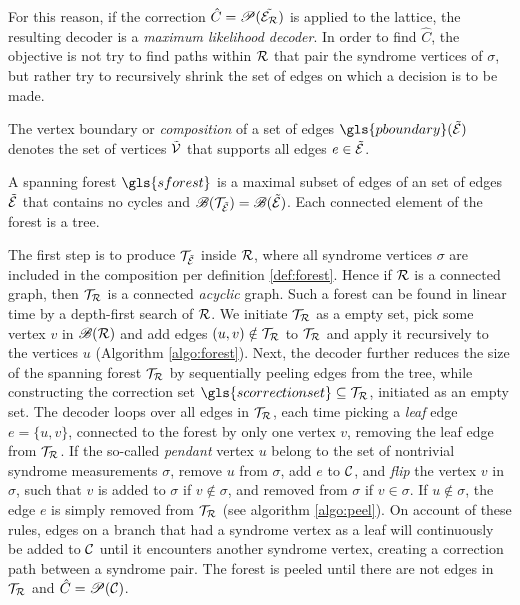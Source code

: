 For this reason, if the correction $\hat{C}=\mathscr{P}(\tilde{\mathcal{E}_{\mathcal{R}}})$ is applied to the lattice, the resulting decoder is a \emph{maximum likelihood decoder}. In order to find $\hat{C}$, the objective is not try to find paths within $\mathcal{R}$ that pair the syndrome vertices of $\sigma$, but rather try to recursively shrink the set of edges on which a decision is to be made.
\begin{definition}\label{def:boundaryofedges}
  The vertex boundary or \emph{composition} of a set of edges $\gls{pboundary}(\tilde{\m{E}})$ denotes the set of vertices $\tilde{\mathcal{V}}$ that supports all edges $e\in \tilde{\mathcal{E}}$.
\end{definition}
\begin{definition}\label{def:forest}
  A spanning forest $\gls{sforest}$ is a maximal subset of edges of an set of edges $\tilde{\mathcal{E}}$ that contains no cycles and $\mathscr{B}(\mathcal{T}_{\tilde{\mathcal{E}}}) = \mathscr{B}(\tilde{\mathcal{E}})$. Each connected element of the forest is a tree. 
\end{definition}
The first step  is to produce $\mathcal{T}_{\tilde{\mathcal{E}}}$ inside $\mathcal{R}$, where all syndrome vertices $\sigma$ are included in the composition per definition \ref{def:forest}. Hence if $\mathcal{R}$ is a connected graph, then $\mathcal{T}_{\mathcal{R}}$ is a connected \emph{acyclic} graph. Such a forest can be found in linear time by a depth-first search of $\mathcal{R}$. We initiate $\mathcal{T}_{\mathcal{R}}$ as a empty set, pick some vertex $v$ in $\mathscr{B}(\mathcal{R})$ and add edges $(u,v)\notin \mathcal{T}_{\mathcal{R}}$ to $\mathcal{T}_{\mathcal{R}}$ and apply it recursively to the vertices $u$ (Algorithm \ref{algo:forest}). Next, the decoder further reduces the size of the spanning forest $\mathcal{T}_{\mathcal{R}}$ by sequentially peeling edges from the tree, while constructing the correction set $\gls{scorrectionset}\subseteq \m{T}_\m{R}$, initiated as an empty set. The decoder loops over all edges in $\mathcal{T}_{\mathcal{R}}$, each time picking a \emph{leaf} edge $e = \{u,v\}$, connected to the forest by only one vertex $v$, removing the leaf edge from $\mathcal{T}_{\mathcal{R}}$. If the so-called \emph{pendant} vertex $u$ belong to the set of nontrivial syndrome measurements $\sigma$, remove $u$ from $\sigma$, add $e$ to $\mathcal{C}$, and \emph{flip} the vertex $v$ in $\sigma$, such that $v$ is added to $\sigma$ if $v \notin \sigma$, and removed from $\sigma$ if $v\in\sigma$.  If $u\notin\sigma$, the edge $e$ is simply removed from $\mathcal{T}_{\mathcal{R}}$ (see algorithm \ref{algo:peel}). On account of these rules, edges on a branch that had a syndrome vertex as a leaf will continuously be added to $\mathcal{C}$ until it encounters another syndrome vertex, creating a correction path between a syndrome pair. The forest is peeled until there are not edges in $\mathcal{T}_{\mathcal{R}}$ and $\hat{C}=\mathscr{P}(\mathcal{C})$.

